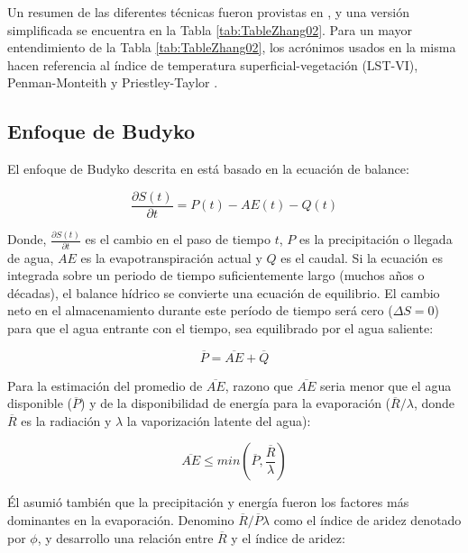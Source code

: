 \documentclass[12pt]{article}
\begin{document}
Un resumen de las diferentes técnicas fueron provistas en \citet{zhang2016review}, y una versión simplificada se encuentra en la Tabla \ref{tab:TableZhang02}. Para un mayor entendimiento de la Tabla \ref{tab:TableZhang02}, los acrónimos usados en la misma hacen referencia al índice de temperatura superficial-vegetación (LST-VI), Penman-Monteith \citep[P-M;][]{penman1948natural,monteith1965evaporation} y Priestley-Taylor \citep[PT;][]{priestley1972assessment}.

\vspace{.5cm}


\subsection{Enfoque de Budyko}

El enfoque de Budyko \citep{Budyko1961,Pike1964} descrita en \citet{Zhang2008} está basado en la ecuación de balance:

\begin{equation}
\frac{\partial S(t)}{\partial t} = P(t) - AE(t) - Q(t) 
\end{equation}

Donde, $\frac{\partial S(t)}{\partial t}$ es el cambio en el paso de tiempo $t$, $P$ es la precipitación o llegada de agua, $AE$ es la evapotranspiración actual y $Q$ es el caudal. Si la ecuación es integrada sobre un periodo de tiempo suficientemente largo (muchos años o décadas), el balance hídrico se convierte una ecuación de equilibrio. El cambio neto en el almacenamiento durante este período de tiempo será cero ($\Delta S = 0$) para que el agua entrante con el tiempo, sea equilibrado por el agua saliente:

\begin{equation}
\overline{P} = \overline{AE} + \overline{Q} 
\label{equ:WB}
\end{equation}

Para la estimación del promedio de $\overline{AE}$, \citet{Budyko1961} razono que $\overline{AE}$ seria menor que el agua disponible ($\overline{P}$) y de la disponibilidad de energía para la evaporación ($\overline{R}/\lambda$, donde $\overline{R}$ es la radiación y $\lambda$ la vaporización latente del agua):

\begin{equation}
\overline{AE} \leq min(\overline{P}, \frac{\overline{R}}{\lambda })
\end{equation}

Él asumió también que la precipitación y energía fueron los factores más dominantes en la evaporación. Denomino $\overline{R}/\overline{P}\lambda$ como el índice de aridez denotado por $\phi$, y desarrollo una relación entre $\overline{R}$ y el índice de aridez:
\end{document}
